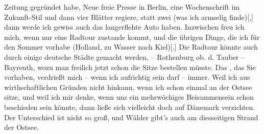                Zeitung gegründet habe, Neue freie Presse in Berlin, eine Wochenschrift im Zukunft-Stil und dann vier Blätter regiere, statt zwei (was ich armselig
                  finde){[},{]} dann werde ich gewiss auch das langerflehte Auto
               haben. Inzwischen freu ich mich, wenn nur eine Radtour zustande kommt, und die
               übrigen Dinge, die ich für den Sommer vorhabe (Holland, zu Wasser nach Kiel){[}.{]} Die Radtour könnte auch durch einige deutsche Städte gemacht werden,
               – Rothenburg ob. d. Tauber – Bayreuth, wozu man freilich jetzt schon die Sitze bestellen
               müsste. Das \label{K_L03416-3v}\label{K_L03416-3}, das Sie vorhaben, verdrießt mich – wenn ich
               aufrichtig sein darf – immer. Weil ich {\dotstwo} aus
               wirthschaftlichen Gründen {\dotstwo} nicht hinkann, wenn ich schon
               einmal an der Ostsee sitze, und weil ich mir
               denke, wenn uns ein mehrwöchiges Beisammensein schon beschieden sein könnte, dann
               ließe sich vielleicht doch auf Dänemark
               verzichten. Der Unterschied ist nicht so groß, und Wälder gibt's auch am diesseitigen
               Strand der Ostsee.\pend
           
